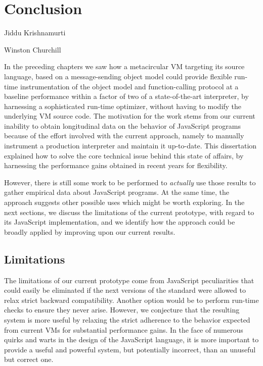 \chapter{Conclusion}
\label{chap:Conclusion}

{Jiddu Krishnamurti}

{Winston Churchill}


In the preceding chapters we saw how a metacircular VM targeting its source
language, based on a message-sending object model could provide flexible
run-time instrumentation of the object model and function-calling protocol at a
baseline performance within a factor of two of a state-of-the-art interpreter, by
harnessing a sophisticated run-time optimizer, without having to modify the
underlying VM source code. The motivation for the work stems from our current
inability to obtain longitudinal data on the behavior of JavaScript programs
because of the effort involved with the current approach, namely to manually
instrument a production interpreter and maintain it up-to-date. This
dissertation explained how to solve the core technical issue behind this state
of affairs, by harnessing the performance gains obtained in recent years for
flexibility.

However, there is still some work to be performed to \textit{actually} use
those results to gather empirical data about JavaScript programs. At the same
time, the approach suggests other possible uses which might be worth exploring.
In the next sections, we discuss the limitations of the current prototype, with
regard to its JavaScript implementation, and we identify how the approach could
be broadly applied by improving upon our current results.

\section{Limitations}

The limitations of our current prototype come from JavaScript peculiarities
that could easily be eliminated if the next versions of the standard were
allowed to relax strict backward compatibility. Another option would be
to perform run-time checks to ensure they never arise.  However, we conjecture
that the resulting system is more useful by relaxing the strict adherence to
the behavior expected from current VMs for substantial performance gains.  In
the face of numerous quirks and warts in the design of the JavaScript language,
it is more important to provide a useful and powerful system, but potentially
incorrect, than an unuseful but correct one.

